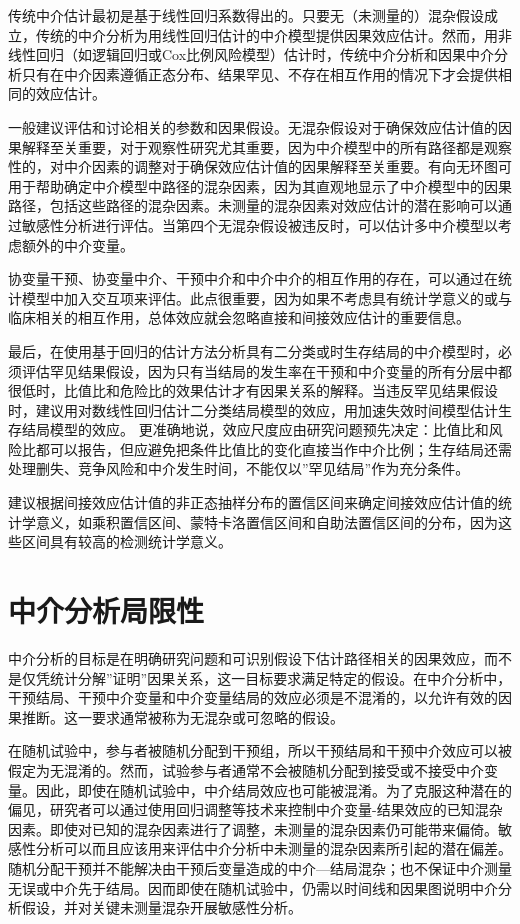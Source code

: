 \documentclass[
  chinese-hans,
  letterpaper,
  DIV=11,
  numbers=noendperiod]{scrreprt}
\begin{document}
传统中介估计最初是基于线性回归系数得出的。只要无（未测量的）混杂假设成立，传统的中介分析为用线性回归估计的中介模型提供因果效应估计。然而，用非线性回归（如逻辑回归或Cox比例风险模型）估计时，传统中介分析和因果中介分析只有在中介因素遵循正态分布、结果罕见、不存在相互作用的情况下才会提供相同的效应估计。

一般建议评估和讨论相关的参数和因果假设。无混杂假设对于确保效应估计值的因果解释至关重要，对于观察性研究尤其重要，因为中介模型中的所有路径都是观察性的，对中介因素的调整对于确保效应估计值的因果解释至关重要。有向无环图可用于帮助确定中介模型中路径的混杂因素，因为其直观地显示了中介模型中的因果路径，包括这些路径的混杂因素。未测量的混杂因素对效应估计的潜在影响可以通过敏感性分析进行评估。当第四个无混杂假设被违反时，可以估计多中介模型以考虑额外的中介变量。

协变量干预、协变量中介、干预中介和中介中介的相互作用的存在，可以通过在统计模型中加入交互项来评估。此点很重要，因为如果不考虑具有统计学意义的或与临床相关的相互作用，总体效应就会忽略直接和间接效应估计的重要信息。

最后，在使用基于回归的估计方法分析具有二分类或时生存结局的中介模型时，必须评估罕见结果假设，因为只有当结局的发生率在干预和中介变量的所有分层中都很低时，比值比和危险比的效果估计才有因果关系的解释。当违反罕见结果假设时，建议用对数线性回归估计二分类结局模型的效应，用加速失效时间模型估计生存结局模型的效应。
更准确地说，效应尺度应由研究问题预先决定：比值比和风险比都可以报告，但应避免把条件比值比的变化直接当作中介比例；生存结局还需处理删失、竞争风险和中介发生时间，不能仅以''罕见结局''作为充分条件。

建议根据间接效应估计值的非正态抽样分布的置信区间来确定间接效应估计值的统计学意义，如乘积置信区间、蒙特卡洛置信区间和自助法置信区间的分布，因为这些区间具有较高的检测统计学意义。

\section{中介分析局限性}\label{ux4e2dux4ecbux5206ux6790ux5c40ux9650ux6027}

中介分析的目标是在明确研究问题和可识别假设下估计路径相关的因果效应，而不是仅凭统计分解''证明''因果关系，这一目标要求满足特定的假设。在中介分析中，干预结局、干预中介变量和中介变量结局的效应必须是不混淆的，以允许有效的因果推断。这一要求通常被称为无混杂或可忽略的假设。

在随机试验中，参与者被随机分配到干预组，所以干预结局和干预中介效应可以被假定为无混淆的。然而，试验参与者通常不会被随机分配到接受或不接受中介变量。因此，即使在随机试验中，中介结局效应也可能被混淆。为了克服这种潜在的偏见，研究者可以通过使用回归调整等技术来控制中介变量-结果效应的已知混杂因素。即使对已知的混杂因素进行了调整，未测量的混杂因素仍可能带来偏倚。敏感性分析可以而且应该用来评估中介分析中未测量的混杂因素所引起的潜在偏差。
随机分配干预并不能解决由干预后变量造成的中介---结局混杂；也不保证中介测量无误或中介先于结局。因而即使在随机试验中，仍需以时间线和因果图说明中介分析假设，并对关键未测量混杂开展敏感性分析。
\end{document}
